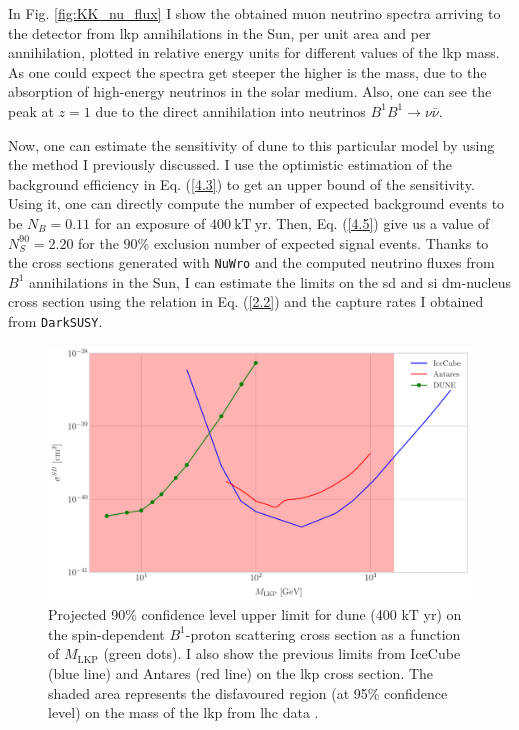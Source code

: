 In Fig. \ref{fig:KK_nu_flux} I show the obtained muon neutrino spectra arriving to the detector from \gls{lkp} annihilations in the Sun, per unit area and per annihilation, plotted in relative energy units for different values of the \gls{lkp} mass. As one could expect the spectra get steeper the higher is the mass, due to the absorption of high-energy neutrinos in the solar medium. Also, one can see  the peak at $z=1$ due to the direct annihilation into neutrinos $B^{1} B^{1} \rightarrow \nu \bar{\nu}$.

Now, one can estimate the sensitivity of \gls{dune} to this particular model by using the method I previously discussed. I use the optimistic estimation of the background efficiency in Eq. (\ref{4.3}) to get an upper bound of the sensitivity. Using it, one can directly compute the number of expected background events to be $N_{B} = 0.11$ for an exposure of $400 \ \mathrm{kT}  \ \mathrm{yr}$. Then, Eq. (\ref{4.5}) give us a value of $N_{S}^{90} = 2.20$ for the $90\%$ exclusion number of expected signal events. Thanks to the cross sections generated with \texttt{NuWro} and the computed neutrino fluxes from $B^{1}$ annihilations in the Sun, I can estimate the limits on the \gls{sd} and \gls{si} \gls{dm}-nucleus cross section using the relation in Eq. (\ref{2.2}) and the capture rates I obtained from \texttt{DarkSUSY}.

\begin{figure}[t]
	\centering
	\includegraphics[width=0.9\linewidth]{Images/DM_Analysis/kk_xsection_sd_bounds}
	\caption[Projected 90\% confidence level upper limit for \gls{dune} on the spin-dependent $B^{1}$-proton scattering cross section as a function of $M_{\mathrm{LKP}}$.]{Projected 90\% confidence level upper limit for \gls{dune} (400 kT yr) on the spin-dependent $B^{1}$-proton scattering cross section as a function of $M_{\mathrm{LKP}}$ (green dots). I also show the previous limits from IceCube \cite{Bernadich2019} (blue line) and Antares \cite{Zornoza2012} (red line) on the \gls{lkp} cross section. The shaded area represents the disfavoured region (at 95\% confidence level) on the mass of the \gls{lkp} from \gls{lhc} data \cite{Deutschmann2017}.}
	\label{fig:kk_xsection_sd_bounds}
\end{figure}

